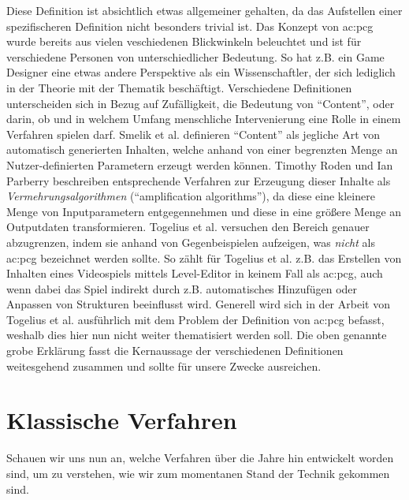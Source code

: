 Diese Definition ist absichtlich etwas allgemeiner gehalten, da das Aufstellen einer spezifischeren Definition nicht
besonders trivial ist. Das Konzept von \gls{ac:pcg} wurde bereits aus vielen veschiedenen Blickwinkeln beleuchtet und
ist für verschiedene Personen von unterschiedlicher Bedeutung. So hat z.B. ein Game Designer eine etwas andere Perspektive
als ein Wissenschaftler, der sich lediglich in der Theorie mit der Thematik beschäftigt. \cite{9_togelius_et_al}
Verschiedene Definitionen unterscheiden sich in Bezug auf Zufälligkeit, die Bedeutung von ``Content'', oder darin, ob und
in welchem Umfang menschliche Intervenierung eine Rolle in einem Verfahren spielen darf. Smelik et al. definieren ``Content''
als jegliche Art von automatisch generierten Inhalten, welche anhand von einer begrenzten Menge an Nutzer-definierten
Parametern erzeugt werden können. \cite{26_smelik_et_al} Timothy Roden und Ian Parberry beschreiben entsprechende Verfahren zur
Erzeugung dieser Inhalte als \textit{Vermehrungsalgorithmen} (``amplification algorithms''), da diese eine kleinere Menge
von Inputparametern entgegennehmen und diese in eine größere Menge an Outputdaten transformieren. \cite{27_roden_parberry}
Togelius et al. \cite{9_togelius_et_al} versuchen den Bereich genauer abzugrenzen, indem sie anhand von Gegenbeispielen
aufzeigen, was \textit{nicht} als \gls{ac:pcg} bezeichnet werden sollte. So zählt für Togelius et al. z.B. das Erstellen von
Inhalten eines Videospiels mittels Level-Editor in keinem Fall als \gls{ac:pcg}, auch wenn dabei das Spiel indirekt durch z.B.
automatisches Hinzufügen oder Anpassen von Strukturen beeinflusst wird. Generell wird sich in der Arbeit
von Togelius et al. \cite{9_togelius_et_al} ausführlich mit dem Problem der Definition von \gls{ac:pcg} befasst, weshalb
dies hier nun nicht weiter thematisiert werden soll. Die oben genannte grobe Erklärung fasst die Kernaussage der verschiedenen
Definitionen weitesgehend zusammen und sollte für unsere Zwecke ausreichen.

\section{Klassische Verfahren}
Schauen wir uns nun an, welche Verfahren über die Jahre hin entwickelt worden sind, um zu verstehen,
wie wir zum momentanen Stand der Technik gekommen sind.

